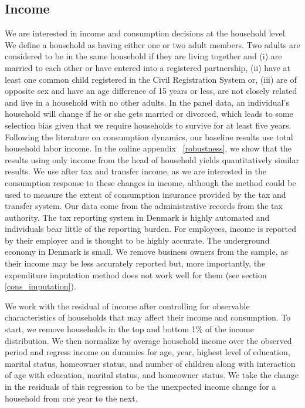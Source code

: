 \documentclass[titlepage]{\econtex}\newcommand{\texname}{ConsumptionHeterogeneity}
\begin{document}
	\subsection{Income} \label{income}
	We are interested in income and consumption decisions at the household level. We define a household as having either one or two adult members. Two adults are considered to be in the same household if they are living together and (i) are married to each other or have entered into a registered partnership, (ii) have at least one common child registered in the Civil Registration System or, (iii) are of opposite sex and have an age difference of 15 years or less, are not closely related and live in a household with no other adults. In the panel data, an individual's household will change if he or she gets married or divorced, which leads to some selection bias given that we require households to survive for at least five years. Following the literature on consumption dynamics, our baseline results use total household labor income. In the online appendix ~\ref{robustness}, we show that the results using only income from the head of household yields quantitatively similar results. We use after tax and transfer income, as we are interested in the consumption response to these changes in income, although the method could be used to measure the extent of consumption insurance provided by the tax and transfer system. Our data come from the administrative records from the tax authority. The tax reporting system in Denmark is highly automated and individuals bear little of the reporting burden. For employees, income is reported by their employer and is thought to be highly accurate. The underground economy in Denmark is small. We remove business owners from the sample, as their income may be less accurately reported but, more importantly, the expenditure imputation method does not work well for them (see section \ref{cons_imputation}).
	
	
	
	We work with the residual of income after controlling for observable characteristics of households that may affect their income and consumption. To start, we remove households in the top and bottom 1\% of the income distribution. We then normalize by average household income over the observed period and regress income on dummies for age, year, highest level of education, marital status, homeowner status, and number of children along with interaction of age with education, marital status, and homeowner status. We take the change in the residuals of this regression to be the unexpected income change for a household from one year to the next.
	
\end{document}
